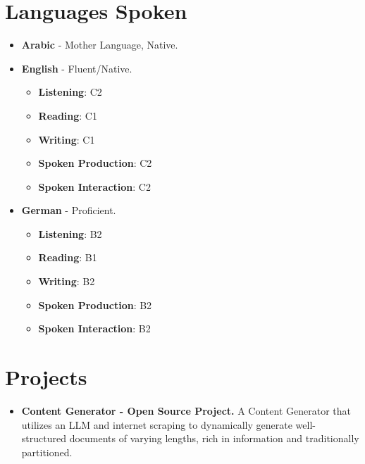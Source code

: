 \documentclass[12pt, letterpaper]{article}
\begin{document}
\section{Languages Spoken}
    \begin{itemize}
        \item \textbf{Arabic} - Mother Language, Native.
        \item \textbf{English} - Fluent/Native.
            \begin{itemize}
                \item \textbf{Listening}: C2
                \item \textbf{Reading}: C1
                \item \textbf{Writing}: C1
                \item \textbf{Spoken Production}: C2
                \item \textbf{Spoken Interaction}: C2
            \end{itemize}
        \item \textbf{German} - Proficient.
        \begin{itemize}
            \item \textbf{Listening}: B2
            \item \textbf{Reading}: B1
            \item \textbf{Writing}: B2
            \item \textbf{Spoken Production}: B2
            \item \textbf{Spoken Interaction}: B2
        \end{itemize}
    \end{itemize}
\section{Projects}
    \begin{itemize}
        \item \textbf{Content Generator - Open Source Project.}
            A Content Generator that utilizes an LLM and internet scraping to dynamically generate well-structured documents of varying lengths, rich in information and traditionally partitioned.
    \end{itemize}
\end{document}
